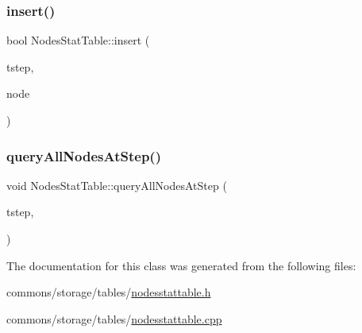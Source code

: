 \mbox{\label{class_nodes_stat_table_a0799bc8fb3e753ed845f416065a81b6f}} 
\subsubsection{\texorpdfstring{insert()}{insert()}}
{\footnotesize\ttfamily bool Nodes\+Stat\+Table\+::insert (\begin{DoxyParamCaption}\item[{int}]{tstep,  }\item[{\mbox{\hyperlink{class_node}{Node}} $\ast$}]{node }\end{DoxyParamCaption})}

\mbox{\label{class_nodes_stat_table_a4af2ed624c3dcaaebd5ff55c735ade9e}} 
\subsubsection{\texorpdfstring{queryAllNodesAtStep()}{queryAllNodesAtStep()}}
{\footnotesize\ttfamily void Nodes\+Stat\+Table\+::query\+All\+Nodes\+At\+Step (\begin{DoxyParamCaption}\item[{int}]{tstep,  }\item[{std\+::function$<$ bool(\mbox{\hyperlink{struct_nodes_stat_table_1_1_node_stat}{Node\+Stat}} stat)$>$}]{ }\end{DoxyParamCaption})}



The documentation for this class was generated from the following files\+:\begin{DoxyCompactItemize}
\item 
commons/storage/tables/\mbox{\hyperlink{nodesstattable_8h}{nodesstattable.\+h}}\item 
commons/storage/tables/\mbox{\hyperlink{nodesstattable_8cpp}{nodesstattable.\+cpp}}\end{DoxyCompactItemize}
